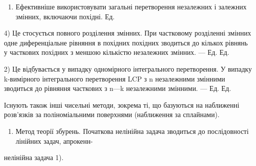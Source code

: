 \documentclass[
  ukrainian,
]{article}
\providecommand{\tightlist}{%
  \setlength{\itemsep}{0pt}\setlength{\parskip}{0pt}}
\begin{document}
\begin{enumerate}
\def\labelenumi{\alph{enumi})}
\setcounter{enumi}{4}
\tightlist
\item
  Ефективніше використовувати загальні перетворення незалежних і
  залежних змінних, включаючи похідні. Ед.
\end{enumerate}

4) Це стосується повного розділення змінних. При частковому розділенні
змінних одне диференціальне рівняння в похідних похідних зводиться до
кількох рівнянь у часткових похідних з меншою кількістю незалежних
змінних. --- Ед. Ед.

2) Це відбувається у випадку одномірного інтегрального перетворення. У
випадку k-вимірного інтегрального перетворення LCP з n незалежними
змінними зводиться до рівняння часткових з n---k незалежними змінними.
--- Ед. Ед.

Існують також інші чисельні методи, зокрема ті, що базуються на
наближенні розв'язків за поліноміальними поверхнями (наближення за
сплайнами).

\begin{enumerate}
\def\labelenumi{\arabic{enumi}.}
\setcounter{enumi}{5}
\tightlist
\item
  Метод теорії збурень. Початкова нелінійна задача зводиться до
  послідовності лінійних задач, апрокенн-
\end{enumerate}

нелінійна задача 1).
\end{document}
